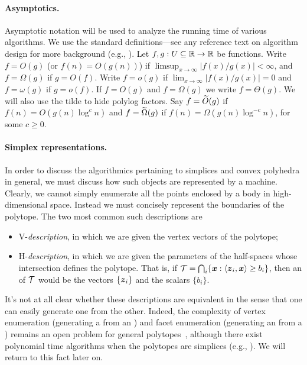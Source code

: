 \paragraph{Asymptotics.}
Asymptotic notation will be used to analyze the running time of various algorithms. We use the standard definitions---see any reference text on algorithm design for more background (e.g., \cite{kleinberg2006algorithm}). Let $f,g:U\subseteq \mathbb{R} \to \mathbb{R}$ be functions. Write $f=O(g)$ (or $f(n)=O(g(n))$) if $\limsup_{x\to \infty}|f(x)/g(x)|<\infty$, and $f=\Omega(g)$ if $g=O(f)$. Write $f=o(g)$  if $\lim_{x\to \infty}|f(x)/g(x)|=0$ and $f=\omega(g)$ if $g=o(f)$. If $f=O(g)$ and $f=\Omega(g)$ we write $f=\Theta(g)$. We will also use the tilde to hide polylog factors. Say $f=\widetilde{O}(g)$ if $f(n) = O(g(n) \log^c n)$ and $f=\widetilde{\Omega}(g)$ if $f(n) = \Omega(g(n) \log^{-c}n)$, for some $c\geq 0$. 


\paragraph{Simplex representations.}
In order to discuss the algorithmics pertaining to simplices and convex polyhedra in general, we must discuss how such objects are represented by a machine. Clearly, we cannot simply enumerate all the points enclosed by a body in high-dimensional space. Instead we must concisely represent the boundaries of the polytope. The two most common such descriptions are 
\begin{itemize}
	\item \textsf{V}-\emph{description}, in which we are given the vertex vectors of the polytope; 
	\item \textsf{H}-\emph{description}, in which we are given the parameters of the half-spaces whose intersection defines the polytope. That is, if $\mathcal{T}=\bigcap_i \{\vb*{x}:\langle \vb*{z}_i,\vb*{x}\rangle \geq b_i\}$, then an \hdesc of $\mathcal{T}$ would be the vectors $\{\vb*{z}_i\}$ and the scalars $\{b_i\}$. 
\end{itemize}

It's not at all clear whether these descriptions are equivalent in the sense that one can easily generate one from the other. Indeed, the complexity of vertex enumeration (generating a \vdesc from an \hdesc) and facet enumeration (generating an \hdesc from a \vdesc) remains an open problem for general polytopes~\cite{kaibel2003some}, although there exist polynomial time algorithms when the polytopes are simplices (e.g., \cite{bremner1998primal}). We will return to this fact later on. 

